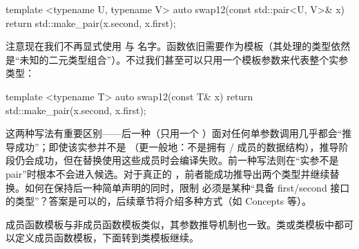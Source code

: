 \begin{code}
template <typename U, typename V>
auto swap12(const std::pair<U, V>& x) {
  return std::make_pair(x.second, x.first);
}
\end{code}

注意现在我们不再显式使用  与  名字。函数依旧需要作为模板（其处理的类型依然是“未知的二元类型组合”）。不过我们甚至可以只用一个模板参数来代表整个实参类型：

\begin{code}
template <typename T> auto swap12(const T& x) {
  return std::make_pair(x.second, x.first);
}
\end{code}

这两种写法有重要区别——后一种（只用一个 ）面对任何单参数调用几乎都会“推导成功”；即使该实参并不是 （更一般地：不是拥有 / 成员的数据结构），推导阶段仍会成功，但在替换使用这些成员时会编译失败。前一种写法则在“实参不是 pair”时根本不会进入候选。对于真正的 ，前者能成功推导出两个类型并继续替换。如何在保持后一种简单声明的同时，限制  必须是某种“具备 first/second 接口的类型”？答案是可以的，后续章节将介绍多种方式（如 Concepts 等）。

成员函数模板与非成员函数模板类似，其参数推导机制也一致。类或类模板中都可以定义成员函数模板，下面转到类模板继续。

